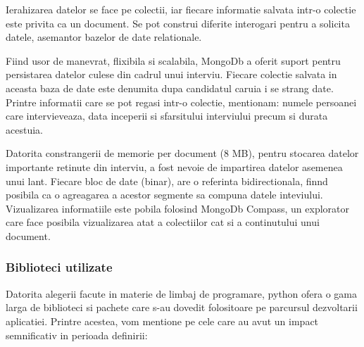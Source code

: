 \documentclass[a4paper, 12pt]{report}
\begin{document}
	Ierahizarea datelor se face pe colectii, iar fiecare informatie salvata intr-o colectie este privita ca un document. Se pot construi diferite interogari pentru a solicita datele, asemantor bazelor de date relationale.
	
	Fiind usor de manevrat, flixibila si scalabila, MongoDb a oferit suport pentru persistarea datelor culese din cadrul unui interviu. Fiecare colectie salvata in aceasta baza de date este denumita dupa candidatul caruia i se strang date. Printre informatii care se pot regasi intr-o colectie, mentionam: numele persoanei care intervieveaza, data inceperii si sfarsitului interviului precum si durata acestuia. 
	
	Datorita constrangerii de memorie per document (8 MB), pentru stocarea datelor importante retinute din interviu, a fost nevoie de impartirea datelor asemenea unui lant. Fiecare bloc de date (binar), are o referinta bidirectionala, finnd posibila ca o agreagarea a acestor segmente sa compuna datele inteviului. Vizualizarea informatiile este pobila folosind MongoDb Compass, un explorator care face posibila vizualizarea atat a colectiilor cat si a continutului unui document.
	
	\subsubsection{Biblioteci utilizate}
	Datorita alegerii facute in materie de limbaj de programare, python ofera o gama larga de biblioteci si pachete care s-au dovedit folositoare pe parcursul dezvoltarii aplicatiei. Printre acestea, vom mentione pe cele care au avut un impact semnificativ in perioada definirii: 
	
\end{document}
